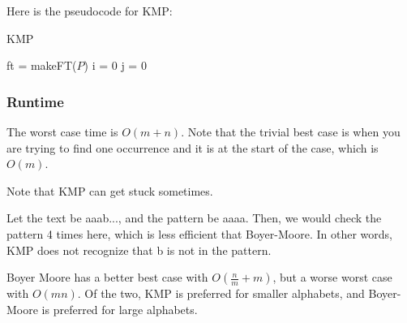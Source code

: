 
Here is the pseudocode for KMP:

\begin{algorithm}[H]
	\caption{KMP}
	ft = makeFT(\( P \))\;
	i = 0\;
	j = 0\;
\end{algorithm}

\subsubsection{Runtime}

The worst case time is \( O(m+n) \). Note that the trivial best case is when you are trying to find one occurrence and it is at the start of the case, which is \( O(m) \).

\begin{note}
	Note that KMP can get stuck sometimes.
\end{note}

\begin{eg}
	Let the text be aaab..., and the pattern be aaaa. Then, we would check the pattern 4 times here, which is less efficient that Boyer-Moore. In other words, KMP does not recognize that b is not in the pattern.
\end{eg}

\begin{note}
	Boyer Moore has a better best case with \( O(\frac{n}{m} + m) \), but a worse worst case with \( O(mn) \). Of the two, KMP is preferred for smaller alphabets, and Boyer-Moore is preferred for large alphabets.
\end{note}
